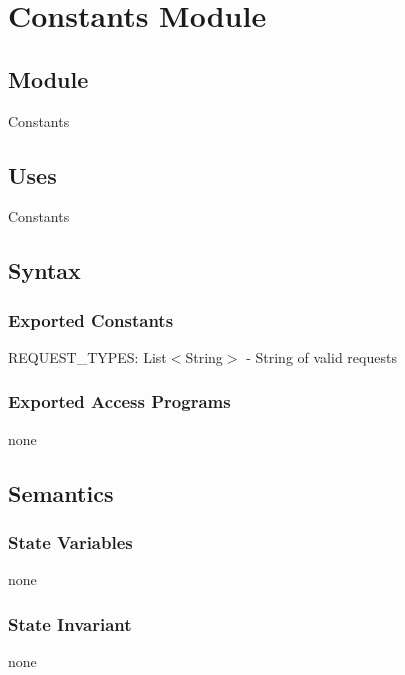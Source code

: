 \documentclass[12pt, titlepage]{article}
\newcommand{\newConstantsModule}[6]{
	\subsection* {Module}
		#1
	\subsection* {Uses}
		#2
	\subsection* {Syntax}
		\subsubsection* {Exported Constants}
			#3
		\subsubsection* {Exported Access Programs}
			#4
	\subsection* {Semantics}
		\subsubsection* {State Variables}
			#5
		\subsubsection* {State Invariant}
			#6
}
\newcommand{\row}[4]{#1 & #2 & #3 & #4 ~\\ \hline}
\newcommand{\accessProgramsTableStart}{
\begin{tabular}{| l | l | l | l |}
\hline
\textbf{Routine name} & \textbf{In} & \textbf{Out} & \textbf{Exceptions}\\
\hline
}
\newcommand{\accessProgramsTableEnd}{
	\end{tabular}
}
\begin{document}
\newpage


\section {Constants Module}

\label{Constants}
\newConstantsModule{Constants}
	{%
		Constants
	}
	{%
		REQUEST\_TYPES: List$<$String$>$ - String of valid requests
	}
	{%
	none
	}
	{%
		none\\

		 
	}
	{%
        none
	}
% 		
	
\end{document}
